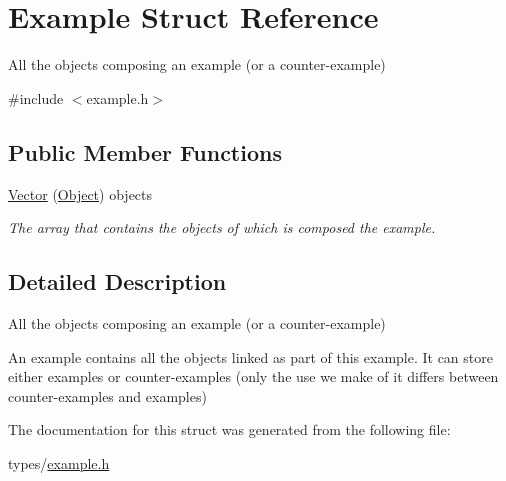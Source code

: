 \hypertarget{struct_example}{}\section{Example Struct Reference}
\label{struct_example}


All the objects composing an example (or a counter-\/example)  




{\ttfamily \#include $<$example.\+h$>$}

\subsection*{Public Member Functions}
\begin{DoxyCompactItemize}
\item 
\hyperlink{struct_example_aaf9d514949fb1c5bb2f751f169f110ed}{Vector} (\hyperlink{struct_object}{Object}) objects\hypertarget{struct_example_aaf9d514949fb1c5bb2f751f169f110ed}{}\label{struct_example_aaf9d514949fb1c5bb2f751f169f110ed}

\begin{DoxyCompactList}\small\item\em The array that contains the objects of which is composed the example. \end{DoxyCompactList}\end{DoxyCompactItemize}


\subsection{Detailed Description}
All the objects composing an example (or a counter-\/example) 

An example contains all the objects linked as part of this example. It can store either examples or counter-\/examples (only the use we make of it differs between counter-\/examples and examples) 

The documentation for this struct was generated from the following file\+:\begin{DoxyCompactItemize}
\item 
types/\hyperlink{example_8h}{example.\+h}\end{DoxyCompactItemize}
